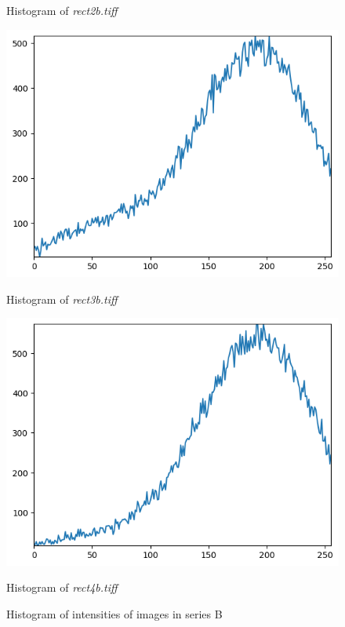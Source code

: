 \documentclass[runningheads]{llncs}
\begin{document}
\begin{figure}[h]
\begin{minipage}[h]{0.47\linewidth}
\begin{center}
\caption{Histogram of \emph{rect2b.tiff}}
\label{2b-Histogram}
\end{center}
\end{minipage}
\vfill
\vspace{0.2 cm}
\begin{minipage}[h]{0.47\linewidth}
\begin{center}
\includegraphics[width=1\linewidth]{Report/Result_Images/histogram_3b.png} 
\caption{Histogram of \emph{rect3b.tiff}}
\label{3b-Histogram}
\end{center}
\end{minipage}
\hfill
\begin{minipage}[h]{0.47\linewidth}
\begin{center}
\includegraphics[width=1\linewidth]{Report/Result_Images/histogram_4b.png} 
\caption{Histogram of \emph{rect4b.tiff}}
\label{4b-Histogram}
\end{center}
\end{minipage}
\caption*{Histogram of intensities of images in series B}
\label{Histogram-B_Series}
\end{figure}
\end{document}

